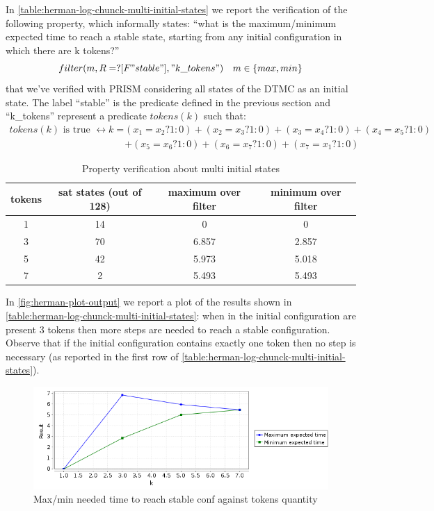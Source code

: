 In \autoref{table:herman-log-chunck-multi-initial-states} we report
the verification of the following property, which informally states:
``what is the maximum/minimum expected time to reach a stable state,
starting from any initial configuration in which there are k tokens?''
\begin{displaymath}
  filter(m, R=? [ F "stable" ], "k\_tokens") \quad m \in \{max, min\}
\end{displaymath}
that we've verified with PRISM considering all states of the DTMC as
an initial state. The label ``stable'' is the predicate defined in the
previous section and ``k\_tokens'' represent a predicate $tokens(k)$
such that:
\begin{displaymath}
  \begin{split}
    tokens(k) \text{ is true } \leftrightarrow k = &(x_1=x_2?1:0)+(x_2=x_3?1:0)+(x_3=x_4?1:0)+(x_4=x_5?1:0)\\
    &+(x_5=x_6?1:0)+(x_6=x_7?1:0)+(x_7=x_1?1:0)
  \end{split}
\end{displaymath}

\begin{table}[ht]
  \begin{center}
    \begin{tabular}{cccc}
      \hline
      tokens & sat states (out of 128)  & maximum over filter &
      minimum over filter \\ 
      \hline     
      1 & 14 & 0 & 0 \\
      3 & 70 & 6.857 & 2.857  \\
      5 & 42 & 5.973 & 5.018  \\
      7 & 2 & 5.493 & 5.493  \\ 
      \hline
    \end{tabular}
    \caption{Property verification about multi initial states}
    \label{table:herman-log-chunck-multi-initial-states}
  \end{center}
\end{table}

In \autoref{fig:herman-plot-output} we report a plot of the results
shown in \autoref{table:herman-log-chunck-multi-initial-states}: when
in the initial configuration are present $3$ tokens then more steps
are needed to reach a stable configuration. Observe that if the
initial configuration contains exactly one token then no step is
necessary (as reported in the first row of
\autoref{table:herman-log-chunck-multi-initial-states}).
\begin{figure}[htb]
  \centering
  \includegraphics[width=13cm]{quantitative-project/max-min-expected-time-experiment.png}
  \caption{Max/min needed time to reach stable conf against
    tokens quantity}
  \label{fig:herman-plot-output}
\end{figure}

